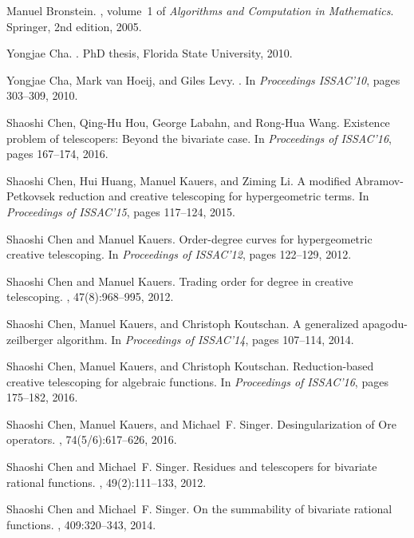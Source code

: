 \documentclass{jssc}
\begin{document}
\begin{thebibliography}{199}
Manuel Bronstein.
, volume~1 of {\em Algorithms and
  Computation in Mathematics}.
\newblock Springer, 2nd edition, 2005.

Yongjae Cha.
.
\newblock PhD thesis, Florida State University, 2010.

Yongjae Cha, Mark van Hoeij, and Giles Levy.
.
\newblock In {\em {Proceedings ISSAC'10}}, pages 303--309, 2010.

Shaoshi Chen, Qing-Hu Hou, George Labahn, and Rong-Hua Wang.
\newblock Existence problem of telescopers: Beyond the bivariate case.
\newblock In {\em Proceedings of ISSAC'16}, pages 167--174, 2016.

Shaoshi Chen, Hui Huang, Manuel Kauers, and Ziming Li.
\newblock A modified {A}bramov-{P}etkovsek reduction and creative telescoping
  for hypergeometric terms.
\newblock In {\em Proceedings of ISSAC'15}, pages 117--124, 2015.

Shaoshi Chen and Manuel Kauers.
\newblock Order-degree curves for hypergeometric creative telescoping.
\newblock In {\em Proceedings of ISSAC'12}, pages 122--129, 2012.

Shaoshi Chen and Manuel Kauers.
\newblock Trading order for degree in creative telescoping.
, 47(8):968--995, 2012.

Shaoshi Chen, Manuel Kauers, and Christoph Koutschan.
\newblock A generalized apagodu-zeilberger algorithm.
\newblock In {\em Proceedings of ISSAC'14}, pages 107--114, 2014.

Shaoshi Chen, Manuel Kauers, and Christoph Koutschan.
\newblock Reduction-based creative telescoping for algebraic functions.
\newblock In {\em Proceedings of ISSAC'16}, pages 175--182, 2016.

Shaoshi Chen, Manuel Kauers, and Michael~F. Singer.
\newblock Desingularization of {O}re operators.
, 74(5/6):617--626, 2016.

Shaoshi Chen and Michael~F. Singer.
\newblock Residues and telescopers for bivariate rational functions.
, 49(2):111--133, 2012.

Shaoshi Chen and Michael~F. Singer.
\newblock On the summability of bivariate rational functions.
, 409:320--343, 2014.


\end{thebibliography}
\end{document}
